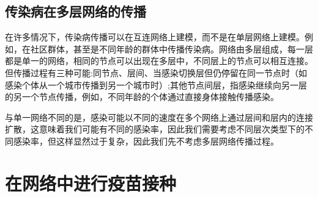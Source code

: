 \documentclass[UTF8]{ctexart}
\begin{document}
\subsection{传染病在多层网络的传播}
在许多情况下，传染病传播可以在互连网络上建模，而不是在单层网络上建模。例如，在社区群体，甚至是不同年龄的群体中传播传染病。网络由多层组成，每一层都是单一的网络，相同的节点可以出现在多层中，不同层上的节点可以相互连接。但传播过程有三种可能:同节点、层间、当感染切换层但仍停留在同一节点时（如感染个体从一个城市传播到另一个城市时）;其他节点间层，指感染继续向另一层的另一个节点传播，例如，不同年龄的个体通过直接身体接触传播感染。
\par 与单一网络不同的是，感染可能以不同的速度在多个网络上通过层间和层内的连接扩散，这意味着我们可能有不同的感染率，因此我们需要考虑不同层次类型下的不同感染率，但这样显然过于复杂，因此我们先不考虑多层网络传播过程。
\section{在网络中进行疫苗接种}
\end{document}

